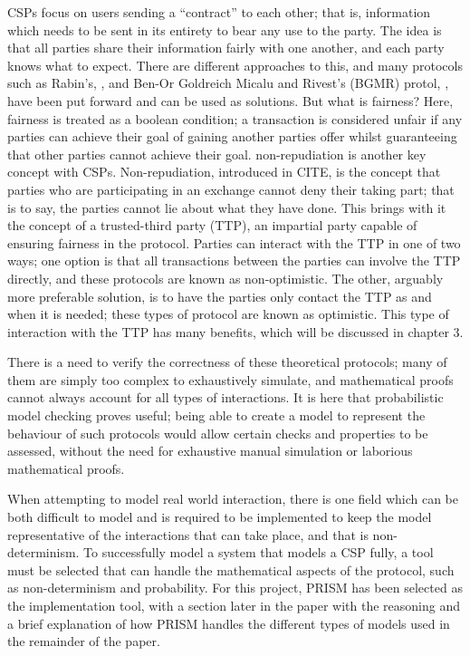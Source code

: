 \documentclass{l4proj}
\begin{document}
CSPs focus on users sending a “contract” to each other; that is, information which needs to be sent in its entirety to bear any use to the party. The idea is that all parties share their information fairly with one another, and each party knows what to expect. There are different approaches to this, and many protocols such as Rabin's, \cite{rabin1983transaction}, and Ben-Or Goldreich Micalu and Rivest's (BGMR) protol, \cite{ben1990fair}, have been put forward and can be used as solutions. But what is fairness? Here, fairness is treated as a boolean condition; a transaction is considered unfair if any parties can achieve their goal of gaining another parties offer whilst guaranteeing that other parties cannot achieve their goal. 
non-repudiation is another key concept with CSPs.
Non-repudiation, introduced in CITE, is the concept that parties who are participating in an exchange cannot deny their taking part; that is to say, the parties cannot lie about what they have done. This brings with it the concept of a trusted-third party (TTP), an impartial party capable of ensuring fairness in the protocol. Parties can interact with the TTP in one of two ways; one option is that all transactions between the parties can involve the TTP directly, and these protocols are known as non-optimistic. The other, arguably more preferable solution, is to have the parties only contact the TTP as and when it is needed; these types of protocol are known as optimistic. This type of interaction with the TTP has many benefits, which will be discussed in chapter 3.

There is a need to verify the correctness of these theoretical protocols; many of them are simply too complex to exhaustively simulate, and mathematical proofs cannot always account for all types of interactions. It is here that probabilistic model checking proves useful; being able to create a model to represent the behaviour of such protocols would allow certain checks and properties to be assessed, without the need for exhaustive manual simulation or laborious mathematical proofs.

When attempting to model real world interaction, there is one field which can be both difficult to model and is required to be implemented to keep the model representative of the interactions that can take place, and that is non-determinism. To successfully model a system that models a CSP fully, a tool must be selected that can handle the mathematical aspects of the protocol, such as non-determinism and probability. For this project, PRISM has been selected as the implementation tool, with a section later in the paper with the reasoning and a brief explanation of how PRISM handles the different types of models used in the remainder of the paper.
\end{document}
